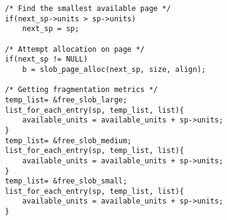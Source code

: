 \documentclass[letterpaper,10pt,onecolumn]{IEEEtran}
\begin{document}
\begin{enumerate}
\begin{itemize}
\begin{lstlisting}
    		/* Find the smallest available page */
    		if(next_sp->units > sp->units)
    			next_sp = sp;
    		
    		/* Attempt allocation on page */
    		if(next_sp != NULL)
    			b = slob_page_alloc(next_sp, size, align);
    	
    		/* Getting fragmentation metrics */
    		temp_list= &free_slob_large;
    		list_for_each_entry(sp, temp_list, list){
    			available_units = available_units + sp->units;
    		}
    		temp_list= &free_slob_medium;
    		list_for_each_entry(sp, temp_list, list){
    			available_units = available_units + sp->units;
    		}
    		temp_list= &free_slob_small;
    		list_for_each_entry(sp, temp_list, list){
    			available_units = available_units + sp->units;
    		}
            \end{lstlisting}
            

\end{itemize}
\end{enumerate}
\end{document}
